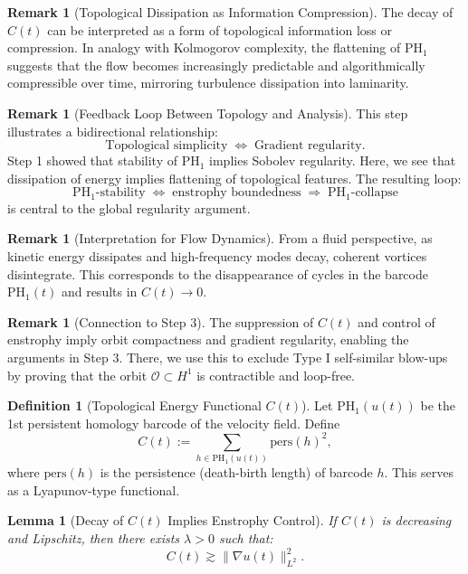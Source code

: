 \documentclass[11pt]{article}
\newtheorem{lemma}[theorem]{Lemma}
\theoremstyle{definition}
\newtheorem{definition}[theorem]{Definition}
\newtheorem{remark}[theorem]{Remark}
\begin{document}
\begin{remark}[Topological Dissipation as Information Compression]
The decay of $C(t)$ can be interpreted as a form of topological information loss or compression. In analogy with Kolmogorov complexity, the flattening of $\mathrm{PH}_1$ suggests that the flow becomes increasingly predictable and algorithmically compressible over time, mirroring turbulence dissipation into laminarity.
\end{remark}

\begin{remark}[Feedback Loop Between Topology and Analysis]
This step illustrates a bidirectional relationship:
\[
\text{Topological simplicity} \;\Longleftrightarrow\; \text{Gradient regularity}.
\]
Step 1 showed that stability of $\mathrm{PH}_1$ implies Sobolev regularity. Here, we see that dissipation of energy implies flattening of topological features. The resulting loop:
\[
\mathrm{PH}_1\text{-stability} \;\Leftrightarrow\; \text{enstrophy boundedness} \;\Rightarrow\; \mathrm{PH}_1\text{-collapse}
\]
is central to the global regularity argument.
\end{remark}

\begin{remark}[Interpretation for Flow Dynamics]
From a fluid perspective, as kinetic energy dissipates and high-frequency modes decay, coherent vortices disintegrate. This corresponds to the disappearance of cycles in the barcode $\mathrm{PH}_1(t)$ and results in $C(t) \to 0$.
\end{remark}

\begin{remark}[Connection to Step 3]
The suppression of $C(t)$ and control of enstrophy imply orbit compactness and gradient regularity, enabling the arguments in Step 3. There, we use this to exclude Type I self-similar blow-ups by proving that the orbit $\mathcal{O} \subset H^1$ is contractible and loop-free.

\begin{definition}[Topological Energy Functional $C(t)$]
Let $\mathrm{PH}_1(u(t))$ be the 1st persistent homology barcode of the velocity field. Define
\[
C(t) := \sum_{h \in \mathrm{PH}_1(u(t))} \mathrm{pers}(h)^2,
\]
where $\mathrm{pers}(h)$ is the persistence (death-birth length) of barcode $h$. This serves as a Lyapunov-type functional.
\end{definition}

\begin{lemma}[Decay of $C(t)$ Implies Enstrophy Control]
If $C(t)$ is decreasing and Lipschitz, then there exists $\lambda > 0$ such that:
\[
C(t) \gtrsim \| \nabla u(t) \|_{L^2}^2.
\]
\end{lemma}
\end{remark}
\end{document}
